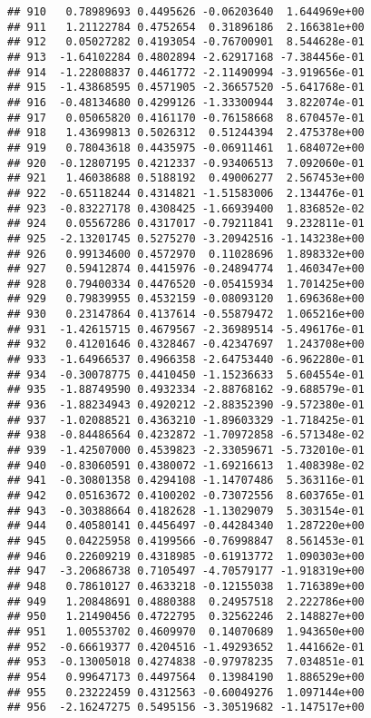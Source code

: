 \documentclass[
]{article}
\begin{document}
\begin{verbatim}
## 910   0.78989693 0.4495626 -0.06203640  1.644969e+00
## 911   1.21122784 0.4752654  0.31896186  2.166381e+00
## 912   0.05027282 0.4193054 -0.76700901  8.544628e-01
## 913  -1.64102284 0.4802894 -2.62917168 -7.384456e-01
## 914  -1.22808837 0.4461772 -2.11490994 -3.919656e-01
## 915  -1.43868595 0.4571905 -2.36657520 -5.641768e-01
## 916  -0.48134680 0.4299126 -1.33300944  3.822074e-01
## 917   0.05065820 0.4161170 -0.76158668  8.670457e-01
## 918   1.43699813 0.5026312  0.51244394  2.475378e+00
## 919   0.78043618 0.4435975 -0.06911461  1.684072e+00
## 920  -0.12807195 0.4212337 -0.93406513  7.092060e-01
## 921   1.46038688 0.5188192  0.49006277  2.567453e+00
## 922  -0.65118244 0.4314821 -1.51583006  2.134476e-01
## 923  -0.83227178 0.4308425 -1.66939400  1.836852e-02
## 924   0.05567286 0.4317017 -0.79211841  9.232811e-01
## 925  -2.13201745 0.5275270 -3.20942516 -1.143238e+00
## 926   0.99134600 0.4572970  0.11028696  1.898332e+00
## 927   0.59412874 0.4415976 -0.24894774  1.460347e+00
## 928   0.79400334 0.4476520 -0.05415934  1.701425e+00
## 929   0.79839955 0.4532159 -0.08093120  1.696368e+00
## 930   0.23147864 0.4137614 -0.55879472  1.065216e+00
## 931  -1.42615715 0.4679567 -2.36989514 -5.496176e-01
## 932   0.41201646 0.4328467 -0.42347697  1.243708e+00
## 933  -1.64966537 0.4966358 -2.64753440 -6.962280e-01
## 934  -0.30078775 0.4410450 -1.15236633  5.604554e-01
## 935  -1.88749590 0.4932334 -2.88768162 -9.688579e-01
## 936  -1.88234943 0.4920212 -2.88352390 -9.572380e-01
## 937  -1.02088521 0.4363210 -1.89603329 -1.718425e-01
## 938  -0.84486564 0.4232872 -1.70972858 -6.571348e-02
## 939  -1.42507000 0.4539823 -2.33059671 -5.732010e-01
## 940  -0.83060591 0.4380072 -1.69216613  1.408398e-02
## 941  -0.30801358 0.4294108 -1.14707486  5.363116e-01
## 942   0.05163672 0.4100202 -0.73072556  8.603765e-01
## 943  -0.30388664 0.4182628 -1.13029079  5.303154e-01
## 944   0.40580141 0.4456497 -0.44284340  1.287220e+00
## 945   0.04225958 0.4199566 -0.76998847  8.561453e-01
## 946   0.22609219 0.4318985 -0.61913772  1.090303e+00
## 947  -3.20686738 0.7105497 -4.70579177 -1.918319e+00
## 948   0.78610127 0.4633218 -0.12155038  1.716389e+00
## 949   1.20848691 0.4880388  0.24957518  2.222786e+00
## 950   1.21490456 0.4722795  0.32562246  2.148827e+00
## 951   1.00553702 0.4609970  0.14070689  1.943650e+00
## 952  -0.66619377 0.4204516 -1.49293652  1.441662e-01
## 953  -0.13005018 0.4274838 -0.97978235  7.034851e-01
## 954   0.99647173 0.4497564  0.13984190  1.886529e+00
## 955   0.23222459 0.4312563 -0.60049276  1.097144e+00
## 956  -2.16247275 0.5495156 -3.30519682 -1.147517e+00

\end{verbatim}
\end{document}
